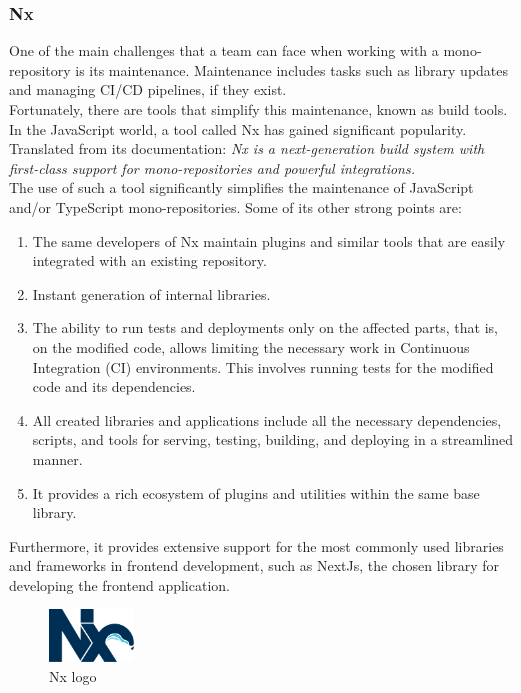 \documentclass[../memory.tex]{subfiles}
\begin{document}
\subsubsection{Nx}
One of the main challenges that a team can face when working with a
mono-repository is its maintenance. Maintenance includes tasks such as library
updates and managing CI/CD pipelines, if they exist.
\\
Fortunately, there are tools that simplify this maintenance, known as build
tools. In the JavaScript world, a tool called Nx has gained significant
popularity. Translated from its documentation: \emph{Nx is a next-generation build
	system with first-class support for mono-repositories and powerful
	integrations.}
\\[8pt]
The use of such a tool significantly simplifies the maintenance of JavaScript
and/or TypeScript mono-repositories. Some of its other strong points are:
\begin{enumerate}
	\item The same developers of Nx maintain plugins and similar tools that are
	      easily integrated with an existing repository.
	\item Instant generation of internal libraries.
	\item The ability to run tests and deployments only on the affected parts,
	      that is, on the modified code, allows limiting the necessary work in
	      Continuous Integration (CI) environments. This involves running tests for
	      the modified code and its dependencies.
	\item All created libraries and applications include all the necessary
	      dependencies, scripts, and tools for serving, testing, building, and
	      deploying in a streamlined manner.
	\item It provides a rich ecosystem of plugins and utilities within the same
	      base library.
\end{enumerate}
Furthermore, it provides extensive support for the most commonly used libraries
and frameworks in frontend development, such as NextJs, the chosen library for
developing the frontend application.
\begin{figure}[H]
	\centering
	\includegraphics[width=0.2\textwidth]{./assets/logos/nx-logo.png}
	\caption{Nx logo}
\end{figure}
\end{document}
